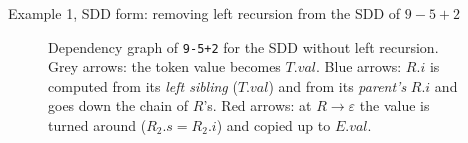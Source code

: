\documentclass[11pt,a4paper]{article}
\begin{document}
\begin{examplebox}{Example 1, SDD form: removing left recursion from the SDD of $9-5+2$}
\begin{figure}[H]
{}
\caption{Dependency graph of \texttt{9-5+2} for the SDD without left recursion. Grey arrows: the token value becomes $T.val$. \textcolor{blue!70!black}{Blue arrows:} $R.i$ is computed from its \emph{left sibling} ($T.val$) and from its \emph{parent's} $R.i$ and goes down the chain of $R$'s. \textcolor{red!70!black}{Red arrows:} at $R\to\varepsilon$ the value is turned around ($R_2.s=R_2.i$) and copied up to $E.val$.}
\label{fig:lrdepgraph}
\end{figure}


\end{examplebox}
\end{document}
